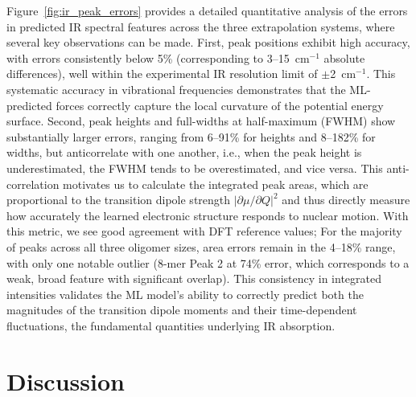 \documentclass[12pt]{article}
\begin{document}
Figure~\ref{fig:ir_peak_errors} provides a detailed quantitative analysis of the errors in predicted IR spectral features across the three extrapolation systems, where several key observations can be made. %
First, peak positions exhibit high accuracy, with errors consistently below 5\% (corresponding to 3--15~cm$^{-1}$ absolute differences), well within the experimental IR resolution limit of $\pm$2~cm$^{-1}$.
This systematic accuracy in vibrational frequencies demonstrates that the ML-predicted forces correctly capture the local curvature of the potential energy surface.
Second, peak heights and full-widths at half-maximum (FWHM) show substantially larger errors, ranging from 6--91\% for heights and 8--182\% for widths, but anticorrelate with one another, i.e.,  when the peak height is underestimated, the FWHM tends to be overestimated, and vice versa.
This anti-correlation motivates us to calculate the integrated peak areas, which are proportional to the transition dipole strength $|\partial\mu/\partial Q|^2$ and thus directly measure how accurately the learned electronic structure responds to nuclear motion. 
With this metric, we see good agreement with DFT reference values;
For the majority of peaks across all three oligomer sizes, area errors remain in the 4--18\% range, with only one notable outlier (8-mer Peak 2 at 74\% error, which corresponds to a weak, broad feature with significant overlap).
This consistency in integrated intensities validates the ML model's ability to correctly predict both the magnitudes of the transition dipole moments and their time-dependent fluctuations, the fundamental quantities underlying IR absorption.


\FloatBarrier
\section{Discussion}
\end{document}
